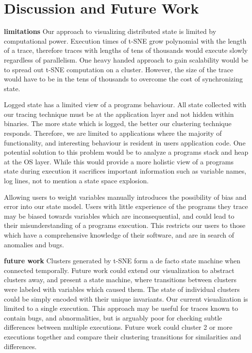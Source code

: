 \section{Discussion and Future Work}
\label{sec:dafw}

\noindent\textbf{limitations}
            Our approach to visualizing distributed state is limited
            by computational power. Execution times of t-SNE grow
            polynomial with the length of a trace, therefore traces
            with lengths of tens of thousands would execute slowly
            regardless of parallelism. One heavy handed approach to
            gain scalability would be to spread out t-SNE computation
            on a cluster. However, the size of the trace would have to
            be in the tens of thousands to overcome the cost of
            synchronizing state.

            Logged state has a limited view of a programs behaviour.
            All state collected with our tracing technique must be at
            the application layer and not hidden within binaries. The
            more state which is logged, the better our clustering
            technique responds. Therefore, we are limited to
            applications where the majority of functionality, and
            interesting behaviour is resident in users application
            code. One potential solution to this problem would be to
            analyze a programs stack and heap at the OS layer. While
            this would provide a more holistic view of a programs
            state during execution it sacrifices important information
            such as variable names, log lines, not to mention a state
            space explosion.

            Allowing users to weight variables manually introduces the
            possibility of bias and error into our state model. Users
            with little experience of the programs they trace may be
            biased towards variables which are inconsequential, and
            could lead to their misunderstanding of a programs
            execution. This restricts our users to those which have a
            comprehensive knowledge of their software, and are in
            search of anomalies and bugs.

\noindent\textbf{future work}
            Clusters generated by t-SNE form a de facto state machine
            when connected temporally. Future work could extend our
            visualization to abstract clusters away, and present a
            state machine, where transitions between clusters were
            labeled with variables which caused them. The state of
            individual clusters could be simply encoded with their
            unique invariants.
            Our current visualization is limited to a single
            execution. This approach may be useful for traces known
            to contain bugs, and abnormalities, but is arguably poor
            for checking subtle differences between multiple
            executions. Future work could cluster 2 or more executions
            together and compare their clustering transitions for
            similarities and differences. 
